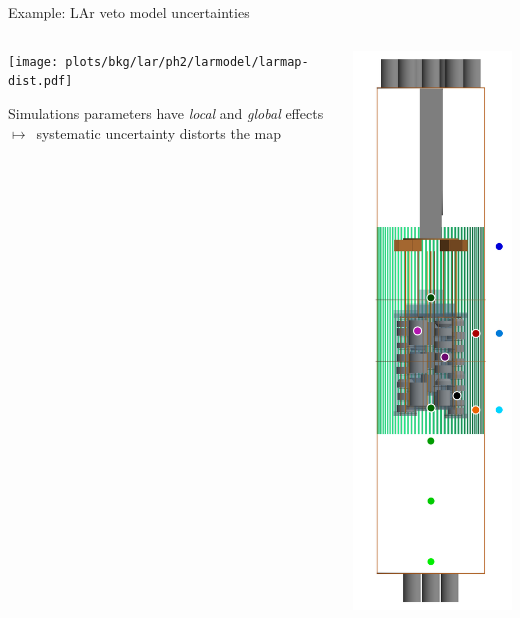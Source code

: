 \documentclass[10pt,aspectratio=169]{beamer}
\newcommand{\arrow}{$\longmapsto$}
\begin{document}
\begin{frame}{Example: LAr veto model uncertainties}
  \begin{columns}
    \begin{column}{0.85\textwidth}
      \begin{center}
        \texttt{[image: plots/bkg/lar/ph2/larmodel/larmap-dist.pdf]}
      \end{center}
      Simulations parameters have \emph{local} and \emph{global} effects
      \arrow\ systematic uncertainty \alert{distorts} the map
    \end{column}
    \begin{column}{0.15\textwidth}
      \begin{center}
        \includegraphics[height=0.9\textheight]{plots/bkg/lar/ph2/larmodel/lar-points-position.pdf}

\end{center}
\end{column}
\end{columns}
\end{frame}
\end{document}
